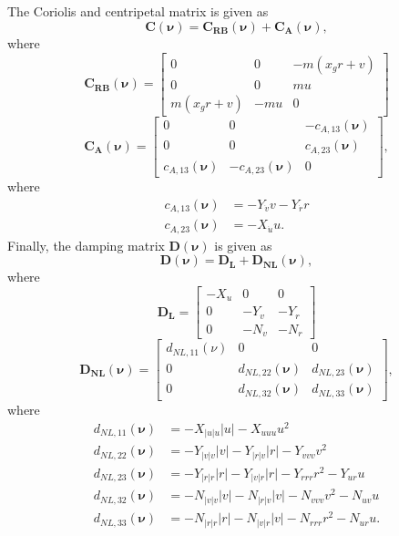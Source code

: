 The Coriolis and centripetal matrix is given as
\begin{equation}
\boldsymbol{C}(\boldsymbol{\nu}) = \boldsymbol{C_{RB}}(\boldsymbol{\nu}) + \boldsymbol{C_A}(\boldsymbol{\nu}),
\end{equation}
where
\begin{equation}
\boldsymbol{C_{RB}}(\boldsymbol{\nu}) = 
\begin{bmatrix}
0 & 0 & -m(x_gr + v)\\
0 & 0 & mu\\
m(x_gr + v) & -mu & 0
\end{bmatrix}
\end{equation}
\begin{equation}
\boldsymbol{C_{A}}(\boldsymbol{\nu}) = 
\begin{bmatrix}
0 & 0 & -c_{A,13}(\boldsymbol{\nu})\\
0 & 0 & c_{A,23}(\boldsymbol{\nu})\\
c_{A,13}(\boldsymbol{\nu}) & -c_{A,23}(\boldsymbol{\nu}) & 0
\end{bmatrix},
\end{equation}
where
\begin{align}
c_{A,13}(\boldsymbol{\nu}) &= -Y_{\dot{v}}v - Y_{\dot{r}}r\\
c_{A,23}(\boldsymbol{\nu}) &= -X_{\dot{u}}u.
\end{align}
\newline
Finally, the damping matrix $\boldsymbol{D}(\boldsymbol{\nu})$ is given as
\begin{equation}
\label{D1_nomod}
\boldsymbol{D}(\boldsymbol{\nu}) = \boldsymbol{D_L} + \boldsymbol{D_{NL}}(\boldsymbol{\nu}),
\end{equation}
where
\begin{equation}
\label{D_L_eq}
\boldsymbol{D_L} = 
\begin{bmatrix}
-X_u & 0 & 0\\
0 & -Y_v & -Y_r\\
0 & -N_v & -N_r
\end{bmatrix}
\end{equation}
\begin{equation}
\boldsymbol{D_{NL}}(\boldsymbol{\nu}) = 
\begin{bmatrix}
d_{NL,11}(\nu) & 0 & 0\\
0 & d_{NL,22}(\boldsymbol{\nu}) & d_{NL,23}(\boldsymbol{\nu})\\
0 & d_{NL,32}(\boldsymbol{\nu}) & d_{NL,33}(\boldsymbol{\nu})
\end{bmatrix},
\end{equation}
where
\begin{align}
d_{NL,11}(\boldsymbol{\nu}) &= -X_{|u|u}|u| - X_{uuu}u^2\\
d_{NL,22}(\boldsymbol{\nu}) &= -Y_{|v|v}|v|-Y_{|r|v}|r| - Y_{vvv}v^2\\
d_{NL,23}(\boldsymbol{\nu}) &= -Y_{|r|r}|r|-Y_{|v|r}|r| - Y_{rrr}r^2 - Y_{ur}u\\
d_{NL,32}(\boldsymbol{\nu}) &= -N_{|v|v}|v|-N_{|r|v}|v| - N_{vvv}v^2 - N_{uv}u\\
d_{NL,33}(\boldsymbol{\nu}) &= -N_{|r|r}|r|-N_{|v|r}|v| - N_{rrr}r^2 - N_{ur}u.
\end{align}
 
